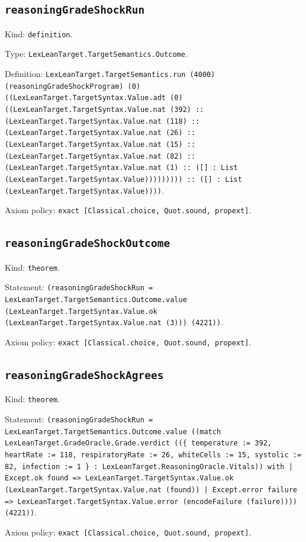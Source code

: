 \documentclass[11pt]{article}
\begin{document}
\subsection*{\texttt{reasoningGradeShockRun}}
\noindent Kind: \texttt{definition}.\par
\noindent Type: \texttt{LexLeanTarget.TargetSemantics.Outcome}.\par
\noindent Definition: \texttt{LexLeanTarget.TargetSemantics.run (4000) (reasoningGradeShockProgram) (0) ((LexLeanTarget.TargetSyntax.Value.adt (0) ((LexLeanTarget.TargetSyntax.Value.nat (392) :: (LexLeanTarget.TargetSyntax.Value.nat (118) :: (LexLeanTarget.TargetSyntax.Value.nat (26) :: (LexLeanTarget.TargetSyntax.Value.nat (15) :: (LexLeanTarget.TargetSyntax.Value.nat (82) :: (LexLeanTarget.TargetSyntax.Value.nat (1) :: ([] : List (LexLeanTarget.TargetSyntax.Value))))))))) :: ([] : List (LexLeanTarget.TargetSyntax.Value))))}.\par
\noindent Axiom policy: \texttt{exact [Classical.choice, Quot.sound, propext]}.\par
\subsection*{\texttt{reasoningGradeShockOutcome}}
\noindent Kind: \texttt{theorem}.\par
\noindent Statement: \texttt{(reasoningGradeShockRun = LexLeanTarget.TargetSemantics.Outcome.value (LexLeanTarget.TargetSyntax.Value.ok (LexLeanTarget.TargetSyntax.Value.nat (3))) (4221))}.\par
\noindent Axiom policy: \texttt{exact [Classical.choice, Quot.sound, propext]}.\par
\subsection*{\texttt{reasoningGradeShockAgrees}}
\noindent Kind: \texttt{theorem}.\par
\noindent Statement: \texttt{(reasoningGradeShockRun = LexLeanTarget.TargetSemantics.Outcome.value ((match LexLeanTarget.GradeOracle.Grade.verdict ((\{ temperature := 392, heartRate := 118, respiratoryRate := 26, whiteCells := 15, systolic := 82, infection := 1 \} : LexLeanTarget.ReasoningOracle.Vitals)) with | Except.ok found => LexLeanTarget.TargetSyntax.Value.ok (LexLeanTarget.TargetSyntax.Value.nat (found)) | Except.error failure => LexLeanTarget.TargetSyntax.Value.error (encodeFailure (failure)))) (4221))}.\par
\noindent Axiom policy: \texttt{exact [Classical.choice, Quot.sound, propext]}.\par
\end{document}
